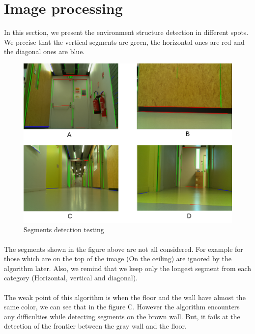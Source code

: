 \documentclass[12pt]{report}
\begin{document}
	\section{Image processing}
	\paragraph{}
	In this section, we present the environment structure detection in different spots. We precise that the vertical segments are green, the horizontal ones are red and the diagonal ones are blue.
		\begin{figure}[H]
		\begin{center}
			\includegraphics[scale=0.70]{res/img_proc.png}
			\caption{Segments detection testing}
		\end{center}
	\end{figure}
	\paragraph{}
	The segments shown in the figure above are not all considered. For example for those which are on the top of the image (On the ceiling) are ignored by the algorithm later. Also, we remind that we keep only the longest segment from each category (Horizontal, vertical and diagonal).
	\paragraph{}
	The weak point of this algorithm is when the floor and the wall have almost the same color, we can see that in the figure C. However the algorithm encounters any difficulties while detecting segments on the brown wall. But, it fails at the detection of the frontier between the gray wall and the floor.
	
\end{document}
